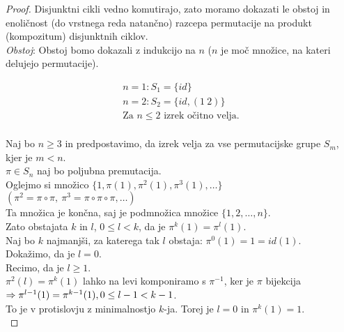 \documentclass[a4paper,12pt]{article}
\begin{document}
\begin{proof}
Disjunktni cikli vedno komutirajo, zato moramo dokazati le obstoj in enoličnost (do vrstnega reda natančno) razcepa permutacije na produkt (kompozitum) disjunktnih ciklov.\\

\textit{Obstoj}: Obstoj bomo dokazali z indukcijo na $n$ ($n$ je moč množice, na kateri delujejo permutacije). 

\begin{gather*}
n=1: S_1=\{ id\} \\
n=2: S_2=\{ id, (1~2)\} \\
\text{Za $n \leq 2$ izrek očitno velja}. \\
\end{gather*}

\noindent Naj bo $n \geq 3$ in predpostavimo, da izrek velja za vse permutacijske grupe $S_m$, kjer je $m < n$. \\

\noindent $\pi \in S_n$ naj bo poljubna premutacija. \\

Oglejmo si množico $\{ 1,\pi(1),\pi^2(1),\pi^3(1),\ldots\}$ \\

$(\pi^2=\pi \circ \pi,~\pi^3=\pi \circ \pi \circ \pi,\ldots)$\\

\noindent Ta množica je končna, saj je podmnožica množice $\{1,2,\ldots,n\}$. \\

Zato obstajata $k$ in $l$, $0 \leq l < k$, da je $\pi^k(1)=\pi^l(1)$.\\

\noindent Naj bo $k$ najmanjši, za katerega tak $l$ obstaja: $\pi^0(1)=1 = id(1)$. \\

\noindent Dokažimo, da je $l=0$. \\

\noindent Recimo, da je $l \geq 1$. \\

$\pi^2(l)=\pi^k(1)$ lahko na levi komponiramo s $\pi^{-1}$, ker je $\pi$ bijekcija $\Rightarrow \pi^{l-1}(1)=\pi^{k-1}(1), \linebreak 0\leq l-1 < k-1$. \\

To je v protislovju z minimalnostjo $k$-ja. Torej je $l=0$ in $\pi^k(1)=1$. \\


\end{proof}
\end{document}
